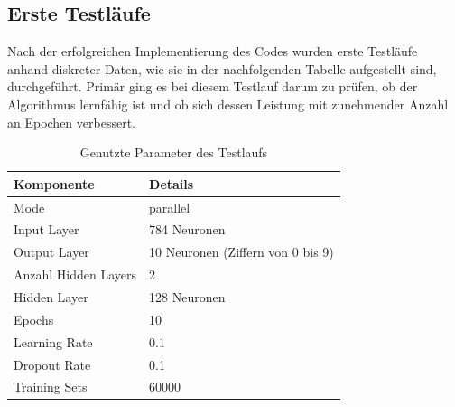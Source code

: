 \documentclass[a4paper, 12pt]{article}
\begin{document}
\subsection{Erste Testläufe}\label{chapter..4.1}

Nach der erfolgreichen Implementierung des Codes wurden erste Testläufe anhand diskreter Daten, wie 
sie in der nachfolgenden Tabelle aufgestellt sind, durchgeführt. Primär ging es bei diesem Testlauf 
darum zu prüfen, ob der Algorithmus lernfähig ist und ob sich dessen Leistung mit zunehmender Anzahl 
an Epochen verbessert.

\begin{table}[h!]
	\centering
	\begin{tabular}{@{}ll@{}}
	\toprule
	\textbf{Komponente}    & \textbf{Details} \\ \midrule
	Mode                   & parallel \\
	Input Layer            & 784 Neuronen \\
	Output Layer           & 10 Neuronen (Ziffern von 0 bis 9) \\
	Anzahl Hidden Layers   & 2 \\
	Hidden Layer           & 128 Neuronen \\
	Epochs                 & 10 \\
	Learning Rate          & 0.1 \\
	Dropout Rate           & 0.1 \\
	Training Sets          & 60000 \\ \bottomrule
	\end{tabular}
	\caption{Genutzte Parameter des Testlaufs}
	\label{tab:testparas}
\end{table}
\end{document}
